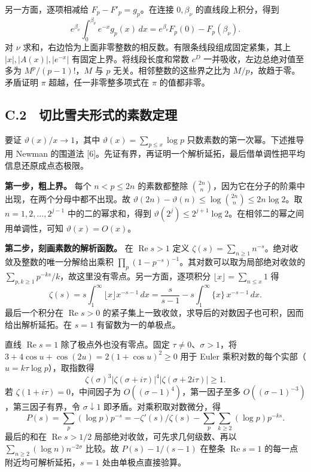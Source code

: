 \documentclass[11pt,a4paper]{article}
\begin{document}
另一方面，逐项相减给 \(F_p-F'_p=g_p\)。在连接 \(0,\beta_\nu\) 的直线段上积分，得到 \[
 e^{\beta_\nu}\int_0^{\beta_\nu}e^{-x}g_p(x)\,dx
 =e^{\beta_\nu}F_p(0)-F_p(\beta_\nu).
\] 对 \(\nu\) 求和，右边恰为上面非零整数的相反数。有限条线段组成固定紧集，其上 \(|x|,|A(x)|,|e^{-x}|\) 有固定上界。将线段长度和常数 \(c^D\) 一并吸收，左边总绝对值至多为 \(M^p/(p-1)!\)，\(M\) 与 \(p\) 无关。相邻整数的这些界之比为 \(M/p\)，故趋于零。矛盾证明 \(\pi\) 超越，任一非零整多项式在 \(\pi\) 的值都非零。

\subsection{C.2　切比雪夫形式的素数定理}\label{c.2-ux5207ux6bd4ux96eaux592bux5f62ux5f0fux7684ux7d20ux6570ux5b9aux7406}

要证 \(\vartheta(x)/x\to1\)，其中 \(\vartheta(x)=\sum_{p\le x}\log p\) 只数素数的第一次幂。下述推导用 Newman 的围道法 {[}6{]}。先证有界，再证明一个解析延拓，最后借单调性把平均信息还原成点态极限。

\textbf{第一步，粗上界。} 每个 \(n<p\le2n\) 的素数都整除 \(\binom{2n}n\)，因为它在分子的阶乘中出现，在两个分母中都不出现。故 \(\vartheta(2n)-\vartheta(n)\le\log\binom{2n}n\le2n\log2\)。取 \(n=1,2,\ldots,2^{j-1}\) 中的二的幂求和，得到 \(\vartheta(2^j)\le2^{j+1}\log2\)。在相邻二的幂之间用单调性，可知 \(\vartheta(x)=O(x)\)。

\textbf{第二步，刻画素数的解析函数。} 在 \(\operatorname{Re}s>1\) 定义 \(\zeta(s)=\sum_{n\ge1}n^{-s}\)。绝对收敛及整数的唯一分解给出乘积 \(\prod_p(1-p^{-s})^{-1}\)。其对数可以取为局部绝对收敛的 \(\sum_{p,k\ge1}p^{-ks}/k\)，故这里没有零点。另一方面，逐项积分 \(\lfloor x\rfloor=\sum_{n\le x}1\) 得 \[
 \zeta(s)=s\int_1^\infty\lfloor x\rfloor x^{-s-1}\,dx
 =\frac{s}{s-1}-s\int_1^\infty\{x\}\,x^{-s-1}\,dx .
\] 最后一个积分在 \(\operatorname{Re}s>0\) 的紧子集上一致收敛，求导后的对数因子也可积，因而给出解析延拓。在 \(s=1\) 有留数为一的单极点。

直线 \(\operatorname{Re}s=1\) 除了极点外也没有零点。固定 \(\tau\ne0\)、\(\sigma>1\)，将 \(3+4\cos u+\cos(2u)=2(1+\cos u)^2\ge0\) 用于 Euler 乘积对数的每个实部（\(u=k\tau\log p\)），取指数得 \[
 \zeta(\sigma)^3|\zeta(\sigma+i\tau)|^4|\zeta(\sigma+2i\tau)|\ge1 .
\] 若 \(\zeta(1+i\tau)=0\)，中间因子为 \(O((\sigma-1)^4)\)，第一因子至多 \(O((\sigma-1)^{-3})\)，第三因子有界，令 \(\sigma\downarrow1\) 即矛盾。对乘积取对数微分，得 \[
 P(s)=\sum_p(\log p)p^{-s}
 =-\zeta'(s)/\zeta(s)-\sum_p\sum_{k\ge2}(\log p)p^{-ks}.
\] 最后的和在 \(\operatorname{Re}s>1/2\) 局部绝对收敛，可先求几何级数、再以 \(\sum_{n\ge2}(\log n)n^{-2\sigma}\) 比较。故 \(P(s)-1/(s-1)\) 在整条 \(\operatorname{Re}s=1\) 的每一点附近均可解析延拓，\(s=1\) 处由单极点直接验算。
\end{document}
